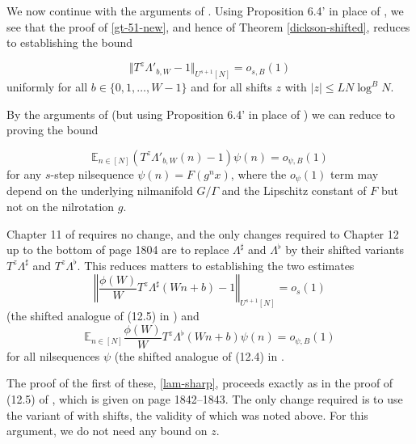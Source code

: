 \documentclass[11pt]{amsart}
\numberwithin{equation}{section}  %
\theoremstyle{remark}
\theoremstyle{plain}
\numberwithin{equation}{section}
\newcommand{\E}{\mathbb{E}}  %
\renewcommand{\leq}{\leqslant}
\renewcommand{\(}{\left(}
\renewcommand{\)}{\right)}
\begin{document}
We now continue with the arguments of \cite[Chapter 7]{gt-linearprimes}. Using Proposition 6.4' in place of \cite[Proposition 6.4]{gt-linearprimes}, we see that the proof of \eqref{gt-51-new}, and hence of Theorem \ref{dickson-shifted}, reduces to establishing the bound

\begin{equation*}\label{gowers-shift} \Vert T^z \Lambda'_{b,W} - 1\Vert_{U^{s+1}[N]} = o_{s,B}(1)\end{equation*} uniformly for all $b \in \{0,1,\dots, W-1\}$ and for all shifts $z$ with $|z| \leq LN\log^B N$. 

By the arguments of \cite[Section 10]{gt-linearprimes} (but using Proposition 6.4' in place of \cite[Proposition 6.4]{gt-linearprimes}) we can reduce to proving the bound

\begin{equation*}\label{nil-cor} \E_{n \in [N]} (T^z \Lambda'_{b,W}(n) - 1) \psi(n) = o_{\psi,B}(1)\end{equation*} for any $s$-step nilsequence $\psi(n) = F(g^n x)$, where the $o_{\psi}(1)$ term may depend on the underlying nilmanifold $G/\Gamma$ and the Lipschitz constant of $F$ but not on the nilrotation $g$.

Chapter 11 of \cite{gt-linearprimes} requires no change, and the only changes required to Chapter 12 up to the bottom of page 1804 are to replace $\Lambda^{\sharp}$ and $\Lambda^{\flat}$ by their shifted variants $T^z\Lambda^{\sharp}$ and $T^z\Lambda^{\flat}$. This reduces matters to establishing the two estimates
\begin{equation}\label{lam-sharp} \left\Vert \frac{\phi(W)}{W} T^z\Lambda^{\sharp}(Wn + b) - 1\right\Vert_{U^{s+1}[N]} = o_s(1)  \end{equation} (the shifted analogue of (12.5) in \cite{gt-linearprimes}) 
and
\begin{equation}\label{lam-flat}  \E_{n \in [N]} \frac{\phi(W)}{W} T^z \Lambda^{\flat}(Wn + b) \psi(n) = o_{\psi, B}(1)\end{equation} for all nilsequences $\psi$ (the shifted analogue of (12.4) in \cite{gt-linearprimes}.

The proof of the first of these, \eqref{lam-sharp}, proceeds exactly as in the proof of (12.5) of \cite{gt-linearprimes}, which is given on page 1842--1843. The only change required is to use the variant of \cite[Theorem D.3]{gt-linearprimes} with shifts, the validity of which was noted above. For this argument, we do not need any bound on $z$.
\end{document}
